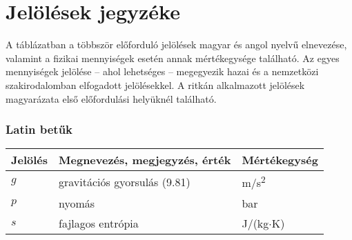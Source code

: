 \newcommand{\tss}{\textsuperscript}     %
\chapter*{Jelölések jegyzéke}

A táblázatban a többször előforduló jelölések magyar és angol nyelvű elnevezése, 
valamint a fizikai mennyiségek esetén annak mértékegysége található. Az egyes 
mennyiségek jelölése – ahol lehetséges – megegyezik hazai és a nemzetközi 
szakirodalomban elfogadott jelölésekkel. A ritkán alkalmazott jelölések 
magyarázata első előfordulási helyüknél található.



\def\arraystretch{1.5}%

\subsection*{Latin betűk}
\begin{center}
    \begin{tabular}{lp{10cm}l}
        \hline
        \large{Jelölés} & \large{Megnevezés, megjegyzés, érték} & \large{Mértékegység} \\ 
        \hline
        $g$     & gravitációs gyorsulás (9.81)  & m/s\tss{2}     \\
        $p$     & nyomás                        & bar           \\
        $s$     & fajlagos entrópia             & J/(kg$\cdot$K)\\
        \hline
    \end{tabular}    
\end{center}




